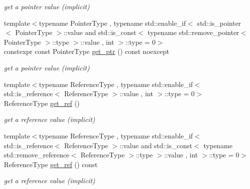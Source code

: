 \begin{DoxyCompactItemize}
\begin{DoxyCompactList}\small\item\em get a pointer value (implicit) \end{DoxyCompactList}\item 
{\footnotesize template$<$typename Pointer\+Type , typename std\+::enable\+\_\+if$<$                                                              std\+::is\+\_\+pointer$<$ Pointer\+Type $>$\+::value                                                           and std\+::is\+\_\+const$<$ typename std\+::remove\+\_\+pointer$<$ Pointer\+Type $>$\+::type $>$\+::value                                                           , int $>$\+::type  = 0$>$ }\\constexpr const Pointer\+Type \hyperlink{a00025_aad65e0bc388897192bf361c24c1d6dda}{get\+\_\+ptr} () const  noexcept
\begin{DoxyCompactList}\small\item\em get a pointer value (implicit) \end{DoxyCompactList}\item 
{\footnotesize template$<$typename Reference\+Type , typename std\+::enable\+\_\+if$<$                                                              std\+::is\+\_\+reference$<$ Reference\+Type $>$\+::value                                                           , int $>$\+::type  = 0$>$ }\\Reference\+Type \hyperlink{a00025_a4f332e90f3cae562d0c3fa6ba48f74f9}{get\+\_\+ref} ()
\begin{DoxyCompactList}\small\item\em get a reference value (implicit) \end{DoxyCompactList}\item 
{\footnotesize template$<$typename Reference\+Type , typename std\+::enable\+\_\+if$<$                                                              std\+::is\+\_\+reference$<$ Reference\+Type $>$\+::value                                                           and std\+::is\+\_\+const$<$ typename std\+::remove\+\_\+reference$<$ Reference\+Type $>$\+::type $>$\+::value                                                           , int $>$\+::type  = 0$>$ }\\Reference\+Type \hyperlink{a00025_aa669d997ddc03566de5438781254b32b}{get\+\_\+ref} () const 
\begin{DoxyCompactList}\small\item\em get a reference value (implicit) \end{DoxyCompactList}\item 

\end{DoxyCompactItemize}

